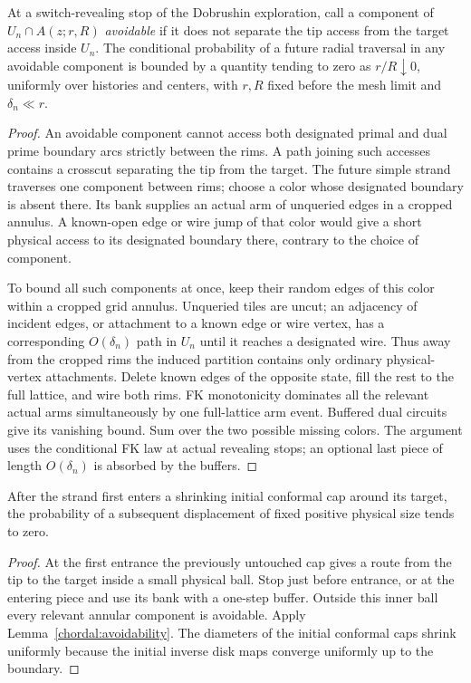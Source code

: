 \begin{lemma}\label{chordal:avoidability}
At a switch-revealing stop of the Dobrushin exploration, call a
component of $U_n\cap A(z;r,R)$ \emph{avoidable} if it does not
separate the tip access from the target access inside $U_n$.
The conditional probability of a future radial traversal in any
avoidable component is bounded by a quantity tending to zero as
$r/R\downarrow0$, uniformly over histories and centers, with $r,R$
fixed before the mesh limit and $\delta_n\ll r$.
\end{lemma}
\begin{proof}
An avoidable component cannot access both designated primal and
dual prime boundary arcs strictly between the rims.  A path joining
such accesses contains a crosscut separating the tip from the target.
The future simple strand traverses one component between rims;
choose a color whose designated boundary is absent there.  Its bank
supplies an actual arm of unqueried edges in a cropped annulus.
A known-open edge or wire jump of that color would give a short
physical access to its designated boundary there, contrary to the
choice of component.

To bound all such components at once, keep their random edges of
this color within a cropped grid annulus.  Unqueried tiles are uncut;
an adjacency of incident edges, or attachment to a known edge or
wire vertex, has a corresponding $O(\delta_n)$ path in $U_n$ until
it reaches a designated wire.  Thus away from the cropped rims the
induced partition contains only ordinary physical-vertex attachments.
Delete known edges of the opposite state, fill the rest to the full
lattice, and wire both rims.  FK monotonicity dominates all the
relevant actual arms simultaneously by one full-lattice arm event.
Buffered dual circuits give its vanishing bound.  Sum over the two
possible missing colors.  The argument uses the conditional FK law
at actual revealing stops; an optional last piece of length
$O(\delta_n)$ is absorbed by the buffers.
\end{proof}

\begin{corollary}\label{chordal:target}
After the strand first enters a shrinking initial conformal cap
around its target, the probability of a subsequent displacement of
fixed positive physical size tends to zero.
\end{corollary}
\begin{proof}
At the first entrance the previously untouched cap gives a route
from the tip to the target inside a small physical ball.  Stop just
before entrance, or at the entering piece and use its bank with a
one-step buffer.  Outside this inner ball every relevant annular
component is avoidable.  Apply Lemma~\ref{chordal:avoidability}.
The diameters of the initial conformal caps shrink uniformly because
the initial inverse disk maps converge uniformly up to the boundary.
\end{proof}

